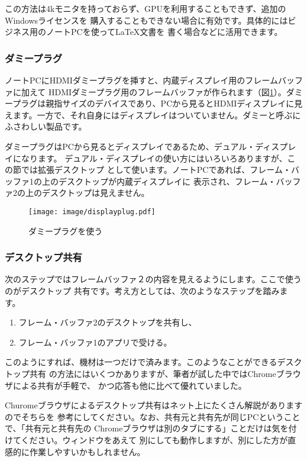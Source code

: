 この方法は4kモニタを持っておらず、GPUを利用することもできず、追加のWindowsライセンスを
購入することもできない場合に有効です。具体的にはビジネス用のノートPCを使って\LaTeX 文書を
書く場合などに活用できます。
\subsubsection{ダミープラグ}
\label{subsubsec:dummyplug}
ノートPCにHDMIダミープラグを挿すと、内蔵ディスプレイ用のフレームバッファに加えて
HDMIダミープラグ用のフレームバッファが作られます（図\ref{fig:display-plug}）。ダミープラグは親指サイズのデバイスであり、PCから見るとHDMIディスプレイに見えます。一方で、それ自身にはディスプレイはついていません。ダミーと呼ぶにふさわしい製品です。

ダミープラグはPCから見るとディスプレイであるため、デュアル・ディスプレイになります。
デュアル・ディスプレイの使い方にはいろいろありますが、この節では拡張デスクトップ
として使います。ノートPCであれば、フレーム・バッファ1の上のデスクトップが内蔵ディスプレイに
表示され、フレーム・バッファ2の上のデスクトップは見えません。


\begin{figure}[btp]
  \begin{center}
    \texttt{[image: image/displayplug.pdf]}
    \caption{ダミープラグを使う} \label{fig:display-plug}
  \end{center}
\end{figure}


\subsubsection{デスクトップ共有}
次のステップではフレームバッファ２の内容を見えるようにします。ここで使うのがデスクトップ
共有です。考え方としては、次のようなステップを踏みます。

\begin{enumerate}
  \item フレーム・バッファ2のデスクトップを共有し、
  \item フレーム・バッファ1のアプリで受ける。
\end{enumerate}

このようにすれば、機材は一つだけで済みます。このようなことができるデスクトップ共有
の方法にはいくつかありますが、筆者が試した中ではChromeブラウザによる共有が手軽で、
かつ応答も他に比べて優れていました。

Churomeブラウザによるデスクトップ共有はネット上にたくさん解説がありますのでそちらを
参考にしてください。なお、共有元と共有先が同じPCということで、「共有元と共有先の
Chromeブラウザは別のタブにする」ことだけは気を付けてください。ウィンドウをあえて
別にしても動作しますが、別にした方が直感的に作業しやすいかもしれません。

